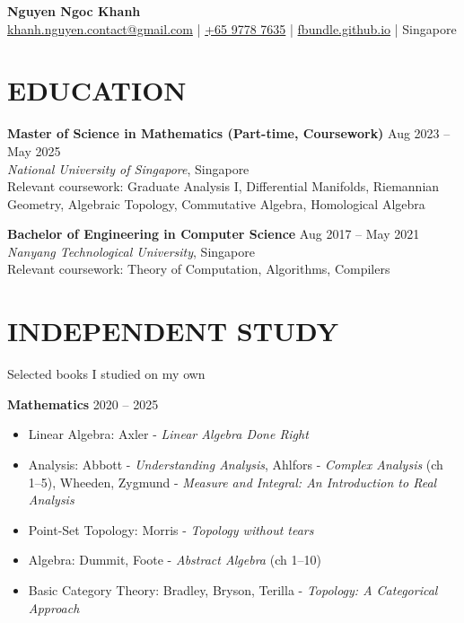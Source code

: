 \documentclass[11pt]{article}
\begin{document}
\begin{center}
    {\LARGE \textbf{Nguyen Ngoc Khanh}} \\
    \href{mailto:khanh.nguyen.contact@gmail.com}{khanh.nguyen.contact@gmail.com} | \href{tel:+6597787635}{+65 9778 7635} | \href{https://fbundle.github.io}{fbundle.github.io} | Singapore
\end{center}

\vspace{0.2cm}

\section*{EDUCATION}

\textbf{Master of Science in Mathematics (Part-time, Coursework)} \hfill Aug 2023 -- May 2025 \\
\textit{National University of Singapore}, Singapore \\
Relevant coursework: Graduate Analysis I, Differential Manifolds, Riemannian Geometry, Algebraic Topology, Commutative Algebra, Homological Algebra

\textbf{Bachelor of Engineering in Computer Science} \hfill Aug 2017 -- May 2021 \\
\textit{Nanyang Technological University}, Singapore \\
Relevant coursework: Theory of Computation, Algorithms, Compilers

\vspace{-0.3cm}
\section*{INDEPENDENT STUDY}

Selected books I studied on my own

\textbf{Mathematics} \hfill 2020 -- 2025 

\begin{itemize}[topsep=0pt, partopsep=0pt, itemsep=0pt, parsep=0pt]
	\item Linear Algebra: Axler - \textit{Linear Algebra Done Right}
	\item Analysis: Abbott - \textit{Understanding Analysis}, Ahlfors - \textit{Complex Analysis} (ch 1--5), Wheeden, Zygmund - \textit{Measure and Integral: An Introduction to Real Analysis}
	\item Point-Set Topology: Morris - \textit{Topology without tears}
	\item Algebra: Dummit, Foote - \textit{Abstract Algebra} (ch 1--10)
	\item Basic Category Theory: Bradley, Bryson, Terilla - \textit{Topology: A Categorical Approach}
\end{itemize}
\end{document}
